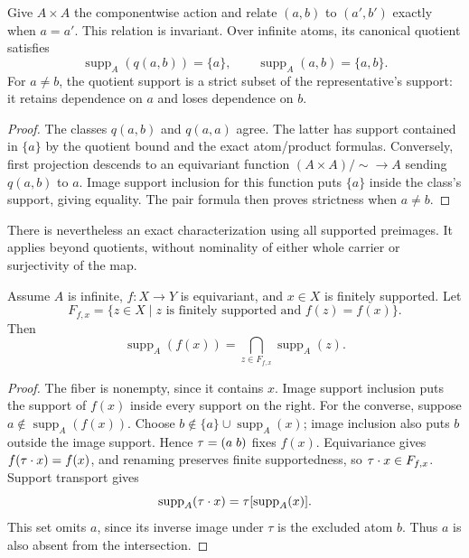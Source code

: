\begin{example}
\label{ex:quotient-strict-support}
Give $A\times A$ the componentwise action and relate $(a,b)$ to $(a',b')$
exactly when $a=a'$. This relation is invariant. Over infinite atoms, its
canonical quotient satisfies
\[
  \operatorname{supp}_A(q(a,b))=\{a\},\qquad
  \operatorname{supp}_A(a,b)=\{a,b\}.
\]
For $a\ne b$, the quotient support is a strict subset of the representative's
support: it retains dependence on $a$ and loses dependence on $b$.
\end{example}

\begin{proof}
The classes $q(a,b)$ and $q(a,a)$ agree. The latter has support contained
in $\{a\}$ by the quotient bound and the exact atom/product formulas.
Conversely, first projection descends to an equivariant function
$(A\times A)/{\sim}\to A$ sending $q(a,b)$ to $a$. Image support inclusion for this
function puts $\{a\}$ inside the class's support, giving equality.
The pair formula then proves strictness when $a\ne b$.
\end{proof}

There is nevertheless an exact characterization using all supported
preimages. It applies beyond quotients, without nominality of either
whole carrier or surjectivity of the map.

\begin{proposition}
\label{prop:supported-fiber}
Assume $A$ is infinite, $f:X\to Y$ is equivariant, and $x\in X$ is
finitely supported. Let
\[
  F_{f,x}=\{z\in X\mid z\text{ is finitely supported and }f(z)=f(x)\}.
\]
Then
\[
  \operatorname{supp}_A(f(x))
  =\bigcap_{z\in F_{f,x}}\operatorname{supp}_A(z).
\]
\end{proposition}

\begin{proof}
The fiber is nonempty, since it contains $x$. Image support inclusion
puts the support of $f(x)$ inside every support on the right.
For the converse, suppose $a\notin\operatorname{supp}_A(f(x))$.
Choose $b\notin\{a\}\cup\operatorname{supp}_A(x)$; image inclusion also
puts $b$ outside the image support. Hence $\tau=(a\;b)$ fixes $f(x)$.
Equivariance gives $f(\tau\mathbin{\cdot} x)=f(x)$, and renaming preserves finite
supportedness, so $\tau\mathbin{\cdot} x\in F_{f,x}$. Support transport gives
\[
  \operatorname{supp}_A(\tau\mathbin{\cdot} x)
  =\tau[\operatorname{supp}_A(x)].
\]
This set omits $a$, since its inverse image under $\tau$ is the excluded
atom $b$. Thus $a$ is also absent from the intersection.
\end{proof}

